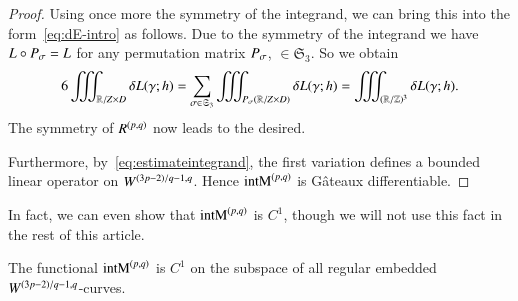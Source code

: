 \begin{proof}
Using once more the symmetry of the integrand, we can bring this into 
the form~\eqref{eq:dE-intro} as follows.
%
%
Due to the symmetry of the integrand we have
$L\circ P_{\sigma}=L$ for any permutation matrix $P_{\sigma}$, $\in\mathfrak S_{3}$.
So we obtain
\begin{equation*}
 6\iiint_{\mathbb R/ Z \times D} \delta L(\gamma; h) 
 =  \sum_{\sigma \in\mathfrak S_{3} } \iiint_{P_{\sigma}(\mathbb R/ Z \times D)} \delta L(\gamma;h)
 = \iiint_{(\mathbb R / \mathbb Z) ^3} \delta L (\gamma;h).
\end{equation*}
The symmetry of $R^{(p,q)}$ now leads to the desired.

Furthermore, by~\eqref{eq:estimateintegrand},
the first variation defines a bounded linear operator on $W^{\scriptstyle (3p-2)/q-1,q}$.
Hence $\mathrm{intM}^{(p,q)}$ is G\^ateaux differentiable.
\end{proof}

In fact, we can even show that $\mathrm{intM}^{(p,q)}$ is $C^1$,
though we will not use this fact in the rest of this article.

\begin{lemma}
 The functional $\mathrm{intM}^{(p,q)}$ is $C^1$ on the subspace of all regular embedded
 $W^{\scriptstyle (3p-2)/q-1,q}$-curves.
\end{lemma}

